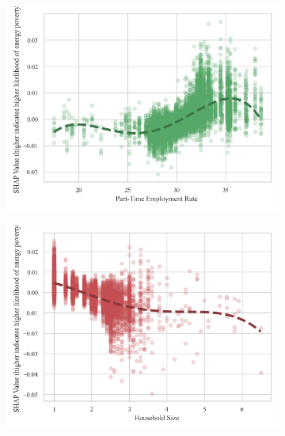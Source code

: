 \documentclass[preprint,authoryear,12pt]{elsarticle}
\begin{document}
\begin{figure}
\begin{subfigure}[b]{0.45\textwidth}
         \includegraphics[width=\textwidth]{Figure4c.png}
     \end{subfigure}
     \hfill
     \begin{subfigure}[b]{0.45\textwidth}
         \centering
         \includegraphics[width=\textwidth]{Figure4d.png}
     \end{subfigure}
     \hfill
     \begin{subfigure}[b]{0.45\textwidth}
         \centering

\end{subfigure}
\end{figure}
\end{document}
